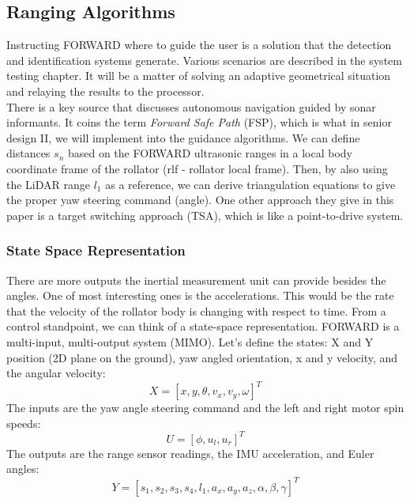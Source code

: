 \subsection{Ranging Algorithms}
\noindent Instructing FORWARD where to guide the user is a solution that the detection and identification systems generate. Various scenarios are described in the system testing chapter. It will be a matter of solving an adaptive geometrical situation and relaying the results to the processor.\\

\noindent There is a key source \cite{forward-safe-path} that discusses autonomous navigation guided by sonar informants. It coins the term \textit{Forward Safe Path} (FSP), which is what in senior design II, we will implement into the guidance algorithms. We can define distances $s_n$ based on the FORWARD ultrasonic ranges in a local body coordinate frame of the rollator (rlf - rollator local frame). Then, by also using the LiDAR range $l_1$ as a reference, we can derive triangulation equations to give the proper yaw steering command (angle). One other approach they give in this paper is a target switching approach (TSA), which is like a point-to-drive system.\\

\subsubsection{State Space Representation}
\noindent There are more outputs the inertial measurement unit can provide besides the angles. One of most interesting ones is the accelerations. This would be the rate that the velocity of the rollator body is changing with respect to time. From a control standpoint, we can think of a state-space representation. FORWARD is a multi-input, multi-output system (MIMO). Let's define the states:
X and Y position (2D plane on the ground), yaw angled orientation, x and y velocity, and the angular velocity:
$$X = [x, y, \theta, v_x, v_y, \omega]^T$$
The inputs are the yaw angle steering command and the left and right motor spin speeds:
$$U = [\phi, u_l, u_r]^T$$
The outputs are the range sensor readings, the IMU acceleration, and Euler angles:
$$Y = [s_1, s_2, s_3, s_4, l_1, a_x, a_y, a_z, \alpha, \beta, \gamma ]^T$$

